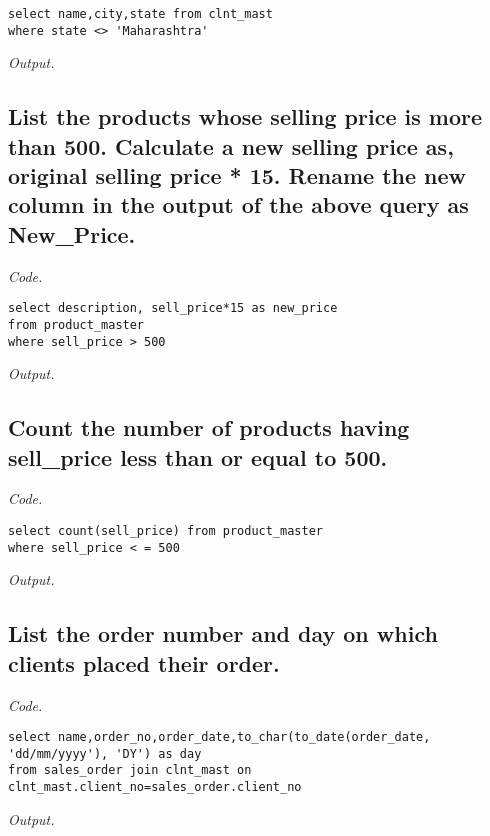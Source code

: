 \documentclass[12pt]{article}
\begin{document}
\begin{lstlisting}
select name,city,state from clnt_mast
where state <> 'Maharashtra'
\end{lstlisting}

\textit{Output.}\\

\subsection{List the products whose selling price is more than 500. Calculate a new selling price as, original selling price * 15. Rename the new column in the output of the above query as New\_Price.}

\textit{Code.}

\begin{lstlisting}
select description, sell_price*15 as new_price 
from product_master
where sell_price > 500
\end{lstlisting}

\textit{Output.}\\

\subsection{Count the number of products having sell\_price less than or equal to 500.}

\textit{Code.}

\begin{lstlisting}
select count(sell_price) from product_master
where sell_price < = 500
\end{lstlisting}

\textit{Output.}\\

\subsection{List the order number and day on which clients placed their order.}

\textit{Code.}

\begin{lstlisting}
select name,order_no,order_date,to_char(to_date(order_date,
'dd/mm/yyyy'), 'DY') as day
from sales_order join clnt_mast on 
clnt_mast.client_no=sales_order.client_no
\end{lstlisting}

\textit{Output.}\\
\end{document}
